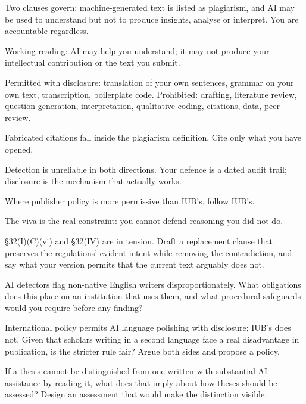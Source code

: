 \begin{chaptersummary}
\begin{tight}
  \item Two clauses govern: machine-generated text is listed as plagiarism, and
    AI may be used to understand but not to produce insights, analyse or
    interpret. You are accountable regardless.
  \item Working reading: AI may help you understand; it may not produce your
    intellectual contribution or the text you submit.
  \item Permitted with disclosure: translation of your own sentences, grammar
    on your own text, transcription, boilerplate code. Prohibited: drafting,
    literature review, question generation, interpretation, qualitative coding,
    citations, data, peer review.
  \item Fabricated citations fall inside the plagiarism definition. Cite only
    what you have opened.
  \item Detection is unreliable in both directions. Your defence is a dated
    audit trail; disclosure is the mechanism that actually works.
  \item Where publisher policy is more permissive than IUB's, follow IUB's.
  \item The viva is the real constraint: you cannot defend reasoning you did
    not do.
\end{tight}
\end{chaptersummary}

\begin{reviewq}
  \item \S32(I)(C)(vi) and \S32(IV) are in tension. Draft a replacement clause
    that preserves the regulations' evident intent while removing the
    contradiction, and say what your version permits that the current text
    arguably does not.
  \item AI detectors flag non-native English writers disproportionately. What
    obligations does this place on an institution that uses them, and what
    procedural safeguards would you require before any finding?
  \item International policy permits AI language polishing with disclosure;
    IUB's does not. Given that scholars writing in a second language face a
    real disadvantage in publication, is the stricter rule fair? Argue both
    sides and propose a policy.
  \item If a thesis cannot be distinguished from one written with substantial
    AI assistance by reading it, what does that imply about how theses should
    be assessed? Design an assessment that would make the distinction visible.
\end{reviewq}
